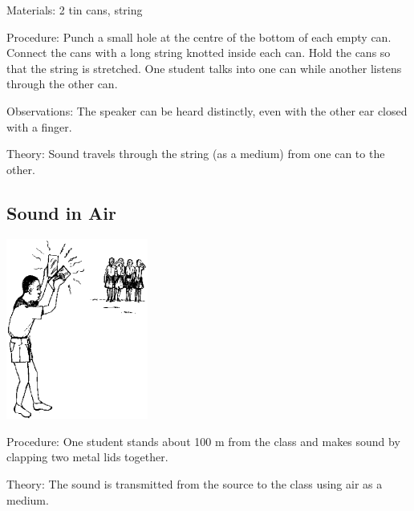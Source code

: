 \begin{multicols}{2}
\begin{description*}
\item[Materials:]{2 tin cans, string}
\item[Procedure:]{Punch a small hole at the centre of the bottom of each empty can. Connect the cans with a long string knotted inside each can. Hold the cans so that the string is stretched. One student talks into one can while another listens through the other can.}
\item[Observations:]{The speaker can be heard distinctly, even with the other ear closed with a finger.}
\item[Theory:]{Sound travels through the string (as a medium) from one can to the other.}
\end{description*}

\subsection{Sound in Air}

\begin{center}
\includegraphics[width=0.35\textwidth]{./img/source/sound-in-air.png}
\end{center}

\begin{description*}
\item[Procedure:]{One student stands about 100 m from the class and makes sound by clapping two metal lids together.}
\item[Theory:]{The sound is transmitted from the source to the class using air as a medium.}
\end{description*}


\end{multicols}
